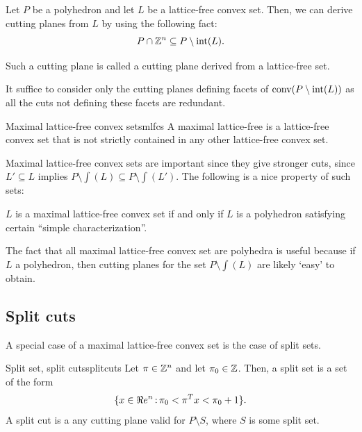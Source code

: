 Let $P$ be a polyhedron and let $L$ be a lattice-free convex set. Then, we can derive cutting planes from $L$ by using the following fact:
$$P\cap {\mathbb{Z}}^n\subseteq P\setminus {\textup{int}}(L).$$

Such a cutting plane is called a cutting plane derived from a lattice-free set. 
\begin{remark}{}{}
It suffice to consider only the cutting planes defining facets of $\textup{conv}(P\setminus{\textup{int}}(L))$ as all the cuts not defining these facets are redundant.
\end{remark}


\begin{definition}{Maximal lattice-free convex sets}{mlfcs}  A maximal lattice-free is a lattice-free convex set that is not strictly contained in any other lattice-free convex set.
\end{definition}


Maximal lattice-free convex sets are important since they give stronger cuts, since $L'\subseteq L$ implies $P\setminus\int(L)\subseteq P\setminus\int(L')$. The following is a nice property of such sets:
\begin{theorem}{}{} $L$ is a maximal lattice-free convex set if and only if $L$ is a polyhedron satisfying certain ``simple characterization''.
\end{theorem}
\begin{remark}{}{}
The fact that all maximal lattice-free convex set are polyhedra is useful because if $L$ a polyhedron, then cutting planes for the set $P\setminus \int(L)$ are likely `easy' to obtain.
\end{remark}

\subsection{Split cuts}

A special case of a maximal lattice-free convex set is the case of split sets.

\begin{definition}{Split set, split cuts}{splitcuts} Let $\pi\in{\mathbb{Z}}^n$ and let $\pi_0\in{\mathbb{Z}}$. Then, a split set is a set of the form
$$\{x\in\Re e^n{\,:\,} \pi_0<\pi^Tx<\pi_0+1\}.$$
A split cut is a any cutting plane valid for $P\setminus S$, where $S$ is some split set. 
\end{definition}

